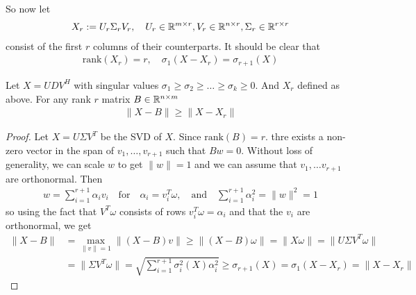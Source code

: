 So now let 
\begin{align*}
  X_r := U_r \Sigma_r V_r, \quad U_r \in \mathbb{R}^{m \times r}, V_r \in \mathbb{R}^{n \times r}, \Sigma_r \in \mathbb{R}^{r \times r}
\end{align*}
consist of the first $r$ columns of their counterparts. It should be clear that
\begin{align*}
  \text{rank}(X_r) = r, \quad \sigma_1(X - X_r) = \sigma_{r+1}(X)
\end{align*}

\begin{lem}
Let $X = UDV^{H}$ with singular values $\sigma_1 \geq \sigma_2 \geq \ldots \geq \sigma_k \geq 0$.
And $X_r$ defined as above.
For any rank $r$ matrix $B \in \mathbb{R}^{n \times m}$
\begin{align*}
  \|X - B\| \geq \|X - X_r\|
\end{align*}
\end{lem}
\begin{proof}
  Let $X = U \Sigma V^{T}$ be the SVD of $X$. Since $\text{rank}(B) = r$. thre exists a non-zero vector in the span of $v_1, \ldots, v_{r+1}$ such that $Bw = 0$.
  Without loss of generality, we can scale $w$ to get $\|w\| = 1$ and we can assume that $v_1, \ldots v_{r+1}$ are orthonormal. Then
  \begin{align*}
    w = \sum_{i=1}^{r+1}\alpha_i v_i \quad \text{for} \quad \alpha_i = v_i^{T} \omega, \quad \text{and} \quad 
    \sum_{i=1}^{r+1}\alpha_i^{2} = \|w\|^{2} = 1
  \end{align*}
  so using the fact that $V^{T} \omega$ consists of rows $v_i^{T} \omega = \alpha_i$ and that the $v_i$ are orthonormal, we get
  \begin{align*}
    \|X - B\| &= \max_{\|v\|=1} \|(X - B)v\| \geq \|(X - B)\omega\| = \|X \omega\| = \|U \Sigma V^{T} \omega\|\\
              &= \|\Sigma V^{T} \omega\| = \sqrt{\sum_{i=1}^{r+1} \sigma_i^{2}(X) \alpha_i^{2}} \geq \sigma_{r+1}(X) = \sigma_1(X - X_r) = \|X - X_r\|
  \end{align*}
\end{proof}


